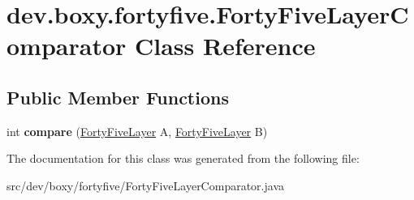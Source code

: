 \hypertarget{classdev_1_1boxy_1_1fortyfive_1_1_forty_five_layer_comparator}{
\section{dev.boxy.fortyfive.FortyFiveLayerComparator Class Reference}
\label{d8/da4/classdev_1_1boxy_1_1fortyfive_1_1_forty_five_layer_comparator}
}
\subsection*{Public Member Functions}
\begin{DoxyCompactItemize}
\item 
\hypertarget{classdev_1_1boxy_1_1fortyfive_1_1_forty_five_layer_comparator_a04ebec0cf64f749b8923e09baf1aff5c}{
int {\bfseries compare} (\hyperlink{interfacedev_1_1boxy_1_1fortyfive_1_1_forty_five_layer}{FortyFiveLayer} A, \hyperlink{interfacedev_1_1boxy_1_1fortyfive_1_1_forty_five_layer}{FortyFiveLayer} B)}
\label{d8/da4/classdev_1_1boxy_1_1fortyfive_1_1_forty_five_layer_comparator_a04ebec0cf64f749b8923e09baf1aff5c}

\end{DoxyCompactItemize}


The documentation for this class was generated from the following file:\begin{DoxyCompactItemize}
\item 
src/dev/boxy/fortyfive/FortyFiveLayerComparator.java\end{DoxyCompactItemize}
